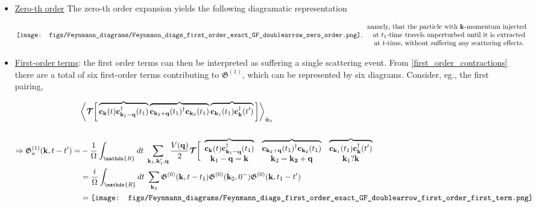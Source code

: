 \documentclass{homework}
\begin{document}
\begin{itemize}
    \item \underline{Zero-th order} The zero-th order expansion yields the following diagramatic representation

    \begin{equation}
        \texttt{[image: figs/Feynmann\_diagrams/Feynmann\_diags\_first\_order\_exact\_GF\_doublearrow\_zero\_order.png]}, \begin{array}{cc}
             \textnormal{namely, that the particle with ${\bf k}$-momentum injected } \\
             \textnormal{ at $t_1$-time travels unperturbed until it is extracted}\\
             \textnormal{ at $t$-time, without suffering any scattering effects.} 
        \end{array}
    \end{equation}

\item \underline{First-order terms}: the first order terms can then be 
interpreted as suffering a single scattering event. From \cref{first_order_contractions} there are a total of six first-order terms contributing to $\mathfrak{G}^{(1)}$, which can be represented by six diagrams. Consider, eg., the first pairing, 

\begin{equation}
\begin{split}
    &\bigg \langle \bm{\mathcal{T}} \bigg[ 
    \overbrace{
    {\bf c}_{{\bf k}}(t) {\bf c}_{{\bf k}_1 - {\bf q}}^\dagger(t_1)
    } \overbrace{
    {\bf c}_{{\bf k}_2 + {\bf q}}(t_1)^\dagger {\bf c}_{{\bf k}_2}(t_1) 
    } \overbrace{
    {\bf c}_{{\bf k}_1}(t_1) {\bf c}_{{\bf k}}^\dagger(t')
    }
    \bigg]\bigg \rangle_{{\Phi_0}}\\
    \\
    \Rightarrow \mathfrak{G}_{a}^{(1)} ({\bf k}, t-t') =& -\frac{1}{\Omega} \int_{\mathds{R}} dt \blanky \sum_{{\bf k}_1, {\bf k}'_1, {\bf q}} \frac{V({\bf q)}}{2} \bm{\mathcal{T}} \bigg[ \begin{array}{ccc}
         \overbrace{
    {\bf c}_{{\bf k}}(t) {\bf c}_{{\bf k}_1 - {\bf q}}^\dagger(t_1)
    } & \overbrace{
    {\bf c}_{{\bf k}_2 + {\bf q}}(t_1)^\dagger {\bf c}_{{\bf k}_2}(t_1) 
    } & \overbrace{
    {\bf c}_{{\bf k}_1}(t_1) {\bf c}_{{\bf k}}^\dagger(t')
    } \\
    {\bf k}_1 - {\bf q} = {\bf k} & {\bf k}_2 = {\bf k_2} + {\bf q} & {\bf k}_1 ? {\bf k}
    \end{array} \\
    &= \frac{i}{\Omega} \int_{\mathds{R}} dt \blanky \sum_{{\bf k}_2} \mathfrak{G}^{(0)}({\bf k}, t- t_1)  \mathfrak{G}^{(0)}({\bf k}_2, 0^-)  \mathfrak{G}^{(0)}({\bf k}, t_1 - t') \\
    &= \texttt{[image: figs/Feynmann\_diagrams/Feynmann\_diags\_first\_order\_exact\_GF\_doublearrow\_first\_order\_first\_term.png]}
\end{split}
\end{equation}


\end{itemize}
\end{document}

